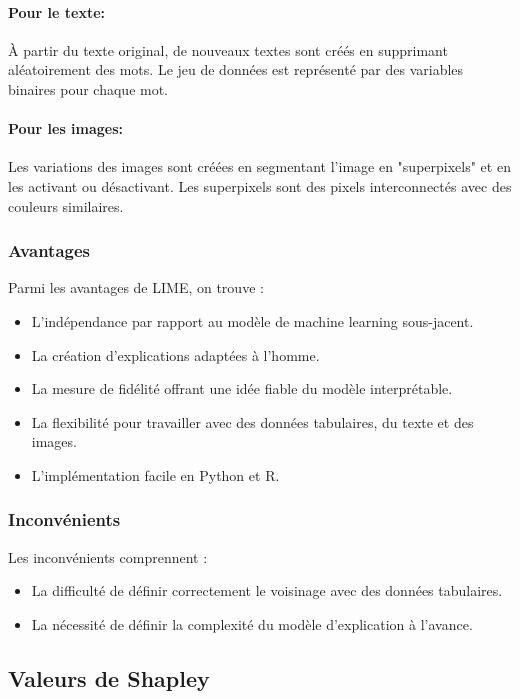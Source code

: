 \paragraph{Pour le texte: }

À partir du texte original, de nouveaux textes sont créés en supprimant aléatoirement des mots. Le jeu de données est représenté par des variables binaires pour chaque mot.

\paragraph{Pour les images: }

Les variations des images sont créées en segmentant l'image en "superpixels" et en les activant ou désactivant. Les superpixels sont des pixels interconnectés avec des couleurs similaires.

\subsubsection{Avantages}

Parmi les avantages de LIME, on trouve :
\begin{itemize}
    \item L'indépendance par rapport au modèle de machine learning sous-jacent.
    \item La création d'explications adaptées à l'homme.
    \item La mesure de fidélité offrant une idée fiable du modèle interprétable.
    \item La flexibilité pour travailler avec des données tabulaires, du texte et des images.
    \item L'implémentation facile en Python et R.
\end{itemize}

\subsubsection{Inconvénients}

Les inconvénients comprennent :
\begin{itemize}
    \item La difficulté de définir correctement le voisinage avec des données tabulaires.
    \item La nécessité de définir la complexité du modèle d'explication à l'avance.
\end{itemize}


\subsection{Valeurs de Shapley}

